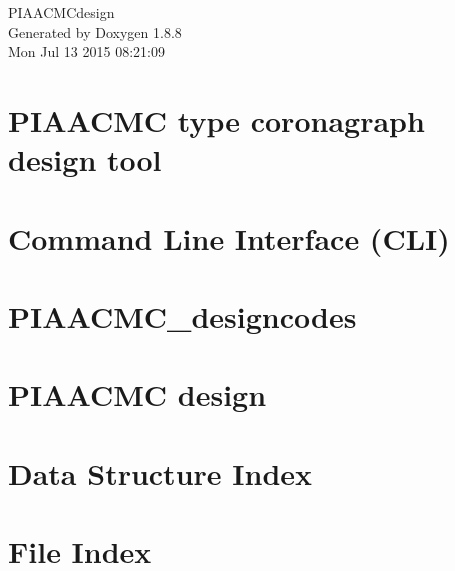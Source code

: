 \documentclass[twoside]{book}
\newcommand{\+}{\discretionary{\mbox{\scriptsize$\hookleftarrow$}}{}{}}
\newcommand{\clearemptydoublepage}{%
  \newpage{\pagestyle{empty}\cleardoublepage}%
}
\begin{document}
\hypersetup{pageanchor=false,
             bookmarks=true,
             bookmarksnumbered=true,
             pdfencoding=unicode
            }
\begin{titlepage}
\vspace*{7cm}
\begin{center}%
{\Large P\+I\+A\+A\+C\+M\+Cdesign }\\
\vspace*{1cm}
{\large Generated by Doxygen 1.8.8}\\
\vspace*{0.5cm}
{\small Mon Jul 13 2015 08:21:09}\\
\end{center}
\end{titlepage}
\clearemptydoublepage
\tableofcontents
\clearemptydoublepage
{}
\hypersetup{pageanchor=true}

\chapter{P\+I\+A\+A\+C\+M\+C type coronagraph design tool}
\label{md_README}
\hypertarget{md_README}{}

\chapter{Command Line Interface (C\+L\+I)}
\label{md_src_CLIcore}
\hypertarget{md_src_CLIcore}{}

\chapter{P\+I\+A\+A\+C\+M\+C\+\_\+designcodes}
\label{md_src_PIAACMCsimul_PIAACMC_designcodes}
\hypertarget{md_src_PIAACMCsimul_PIAACMC_designcodes}{}

\chapter{P\+I\+A\+A\+C\+M\+C design}
\label{md_src_PIAACMCsimul_README}
\hypertarget{md_src_PIAACMCsimul_README}{}

\chapter{Data Structure Index}

\chapter{File Index}

\end{document}
